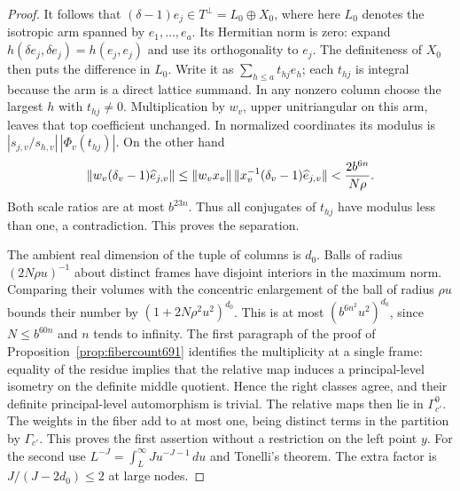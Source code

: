 \documentclass[a4paper,11pt]{article}
\theoremstyle{definition}
\theoremstyle{remark}
\numberwithin{equation}{section}
\begin{document}
\begin{proof}
It follows that \((\delta-1)e_j\in T^\perp=L_0\oplus X_0\),
where here \(L_0\) denotes the isotropic arm spanned by
\(e_1,\ldots,e_a\). Its Hermitian norm is zero: expand
\(h(\delta e_j,\delta e_j)=h(e_j,e_j)\) and use its
orthogonality to \(e_j\). The definiteness of \(X_0\) then
puts the difference in \(L_0\). Write it as
\(\sum_{h\le a}t_{hj}e_h\); each \(t_{hj}\) is integral because
the arm is a direct lattice summand. In any nonzero column
choose the largest \(h\) with \(t_{hj}\ne0\). Multiplication
by \(w_v\), upper unitriangular on this arm, leaves that top
coefficient unchanged. In normalized coordinates its modulus
is \(|s_{j,v}/s_{h,v}|\,|\Phi_v(t_{hj})|\). On the other hand
\[
   \|w_v(\delta_v-1)\widehat e_{j,v}\|
       \le \|w_vx_v\|\,
           \|x_v^{-1}(\delta_v-1)\widehat e_{j,v}\|
       < {2 b^{6n}\over N\rho}.
\]
Both scale ratios are at most \(b^{23n}\). Thus all conjugates
of \(t_{hj}\) have modulus less than one, a contradiction.
This proves the separation.

The ambient real dimension of the tuple of columns is \(d_0\).
Balls of radius \((2N\rho u)^{-1}\) about distinct frames have
disjoint interiors in the maximum norm. Comparing their volumes
with the concentric enlargement of the ball of radius \(\rho u\)
bounds their number by \((1+2N\rho^2u^2)^{d_0}\).
This is at most \((b^{6n^2}u^2)^{d_0}\), since \(N\le b^{60n}\)
and \(n\) tends to infinity. The first paragraph of the proof
of Proposition~\ref{prop:fibercount691} identifies the
multiplicity at a single frame: equality of the residue implies
that the relative map induces a principal-level isometry on the
definite middle quotient. Hence the right classes agree, and
their definite principal-level automorphism is trivial. The
relative maps then lie in \(\Gamma_{c'}^0\). The weights in the
fiber add to at most one, being distinct terms in the partition
by \(\Gamma_{c'}\). This proves the first assertion without a
restriction on the left point \(y\). For the second use
\(L^{-J}=\int_L^\infty Ju^{-J-1}\,du\) and Tonelli's theorem.
The extra factor is \(J/(J-2d_0)\le2\) at large nodes.
\end{proof}
\end{document}
